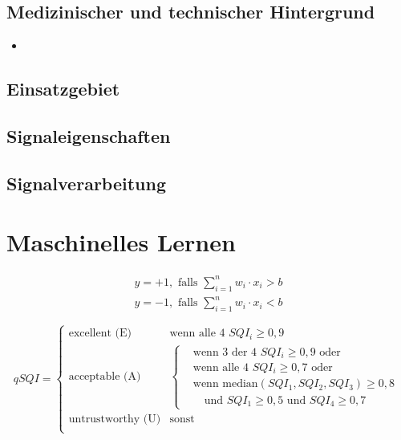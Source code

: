 	\subsection{Medizinischer und technischer Hintergrund}
	
	\begin{itemize}
		\item 
	\end{itemize}
	
	
	\subsection{Einsatzgebiet}
	\subsection{Signaleigenschaften}
	\subsection{Signalverarbeitung}

\section{Maschinelles Lernen}


\[
\begin{gathered}
	y = +1, \text{ falls } \sum_{i=1}^{n} w_i \cdot x_i > b \\
	y = -1, \text{ falls } \sum_{i=1}^{n} w_i \cdot x_i < b
\end{gathered}
\]

\[
qSQI = \begin{cases}
	\text{excellent (E)} & \text{wenn alle 4 } SQI_i \geq 0,9\\
	\text{acceptable (A)} & \begin{cases}
		& \text{wenn 3 der 4 } SQI_i \geq 0,9 \text{ oder}\\
		& \text{wenn alle 4 } SQI_i \geq 0,7 \text{ oder}\\
		& \text{wenn median}(SQI_1, SQI_2, SQI_3) \geq 0,8\\&\text{ }\text{	und } SQI_1 \geq 0,5 \text{ und } SQI_4 \geq 0,7
		\end{cases}\\
	\text{untrustworthy (U)} & \text{sonst}\\
\end{cases}
\]



